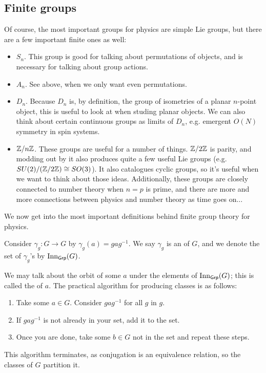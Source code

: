\documentclass[11pt]{article}
\begin{document}
\subsection{Finite groups}

\begin{eexample}
    Of course, the most important groups for physics are simple
    Lie groups, but there are a few important finite ones as well:
    \begin{itemize}
        \item $S_n$. This group is good for talking about permutations
        of objects, and is necessary for talking about group actions.
        \item $A_n$. See above, when we only want even permutations.
        \item $D_n$. Because $D_n$ is, by definition, the group of isometries
        of a planar $n$-point object, this is useful to look at when studing
        planar objects. We can also think about certain continuous groups
        as limits of $D_n$, e.g. emergent $O(N)$ symmetry in spin systems.
        \item $\mathbb{Z}/n\mathbb{Z}$. These groups are useful for a number of things.
        $\mathbb{Z}/2\mathbb{Z}$ is parity, and modding out by it also produces quite
        a few useful Lie groups (e.g. $SU(2)/(\mathbb{Z}/2\mathbb{Z}) \cong SO(3)$). It also
        catalogues cyclic groups, so it's useful when we want to think about
        those ideas. Additionally, these groups are closely connected to number
        theory when $n = p$ is prime, and there are more and more connections
        between physics and number theory as time goes on$\ldots$
    \end{itemize}
\end{eexample}

We now get into the most important definitions behind finite
group theory for physics.

\begin{definition}
    Consider $\gamma_g \colon G \to G$ by $\gamma_g(a) = g a g^{-1}$.
    We say $\gamma_g$ is an  of $G$, and we
    denote the set of $\gamma_g$'s by $\operatorname{Inn}_{\text{\text{\sffamily{Grp}}}}(G)$.
\end{definition}

We may talk about the orbit of some $a$ under the elements of 
$\operatorname{Inn}_{\text{\text{\sffamily{Grp}}}}(G)$; this is called the
 of $a$. The practical algorithm for producing classes
is as follows:
\begin{enumerate}
    \item Take some $a \in G$. Consider $g a g^{-1}$ for all $g$
    in $g$.
    \item If $g a g^{-1}$ is not already in your set, add it to the
    set.
    \item Once you are done, take some $b \in G$ not in the set
    and repeat these steps.
\end{enumerate}
This algorithm terminates, as conjugation is an equivalence relation,
so the classes of $G$ partition it.
\end{document}
